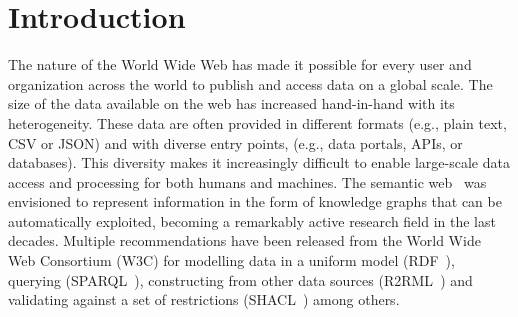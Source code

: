 \chapter{Introduction}
\label{chapter:intro}





The nature of the World Wide Web has made it possible for every user and organization across the world to publish and access data on a global scale. 
The size of the data available on the web has increased hand-in-hand with its heterogeneity. 
These data are often provided in different formats (e.g., plain text, CSV or JSON) and with diverse entry points, (e.g., data portals, APIs, or databases). 
This diversity makes it increasingly difficult to enable large-scale data access and processing for both humans and machines.
The semantic web~\parencite{berners2001semantic} was envisioned to represent information in the form of knowledge graphs that can be automatically exploited, becoming a remarkably active research field in the last decades.
Multiple recommendations have been released from the World Wide Web Consortium (W3C) for modelling data in a uniform model (RDF~\parencite{rdf}), querying (SPARQL~\parencite{harris2013sparql}), constructing from other data sources (R2RML~\parencite{das2012r2rml}) and validating against a set of restrictions (SHACL~\parencite{SHACL}) among others. 

